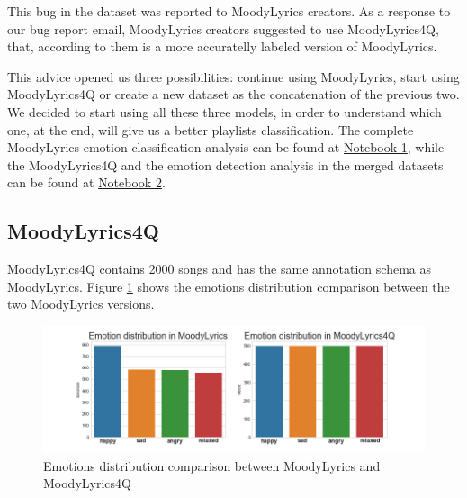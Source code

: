 This bug in the dataset was reported to MoodyLyrics creators. As a response to our bug report email, MoodyLyrics creators suggested to use MoodyLyrics4Q\cite{moodylyrics4q}, that, according to them is a more accuratelly labeled version of MoodyLyrics.\par

This advice opened us three possibilities: continue using MoodyLyrics, start using MoodyLyrics4Q or create a new dataset as the concatenation of the previous two. We decided to start using all these three models, in order to understand which one, at the end, will give us a better playlists classification. The complete MoodyLyrics emotion classification analysis can be found at \href{https://github.com/sgiammy/emotion-patterns-in-music-playlists/blob/master/Notebook/1_ED_in_songs_lyrics.ipynb}{Notebook 1}, while the MoodyLyrics4Q and the emotion detection analysis in the merged datasets can be found at \href{https://github.com/sgiammy/emotion-patterns-in-music-playlists/blob/master/Notebook/2_Advanced_Feature_Engineering.ipynb}{Notebook 2}.


\subsection{MoodyLyrics4Q}
MoodyLyrics4Q contains 2000 songs and has the same annotation schema as MoodyLyrics. Figure \ref{fig:stats} shows the emotions distribution comparison between the two MoodyLyrics versions.

\begin{figure}[H]
\centering
\includegraphics[width=1.1\textwidth]{./chapters/chapter4/images/Stats.png}
\caption{Emotions distribution comparison between MoodyLyrics and MoodyLyrics4Q}
\label{fig:stats}
\end{figure}

